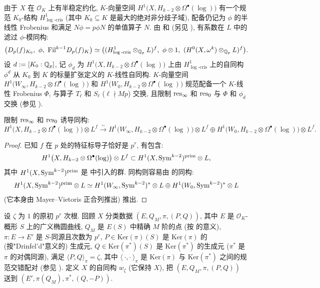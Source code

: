 由于 $X$ 在 $\mathcal{O}_K$ 上有半稳定约化, $K$-向量空间 $H^{1}\bigl(X,H_{k-2} \otimes \Omega^{\bullet}(\log)\bigr)$ 有一个规范 $K_0$-结构 $H^{1}_{\log\text{-}\mathrm{cris}}$ (其中 $K_0 \subseteq K$ 是最大的绝对非分歧子域), 配备仍记为 $\phi$ 的半线性 Frobenius 和满足 $N\phi = p\phi N$ 的单值算子 $N$.
由 \cite{ref:27} 和 \cite{ref:28} (另见 \cite{ref:16}), 有系数在 $L$ 中的滤过 $\phi$-模同构:
\begin{equation}
\label{eq:20}
\bigl(D_p(f)_{K_0},\ \phi,\ \mathrm{Fil}^{k-1}D_p(f)_K\bigr)
\simeq \bigl((H^{1}_{\log\text{-}\mathrm{cris}} \otimes_{\Qp} L)^{f},\ \phi \otimes 1,\ (H^{0}(X,\omega^{k}) \otimes_{\Qp} L)^{f}\bigr).
\end{equation}
设 $d := [K_0:\mathbb{Q}_p]$, 记 $\phi_d$ 为 $H^{1}\bigl(X,H_{k-2} \otimes \Omega^{\bullet}(\log)\bigr)$ 上由 $H^{1}_{\log\text{-}\mathrm{cris}}$ 上的自同构 $\phi^{d}$ 从 $K_0$ 到 $K$ 的标量扩张定义的 $K$-线性自同构.
$K$-向量空间 $H^{1}\bigl(W_{\infty},H_{k-2} \otimes \Omega^{\bullet}(\log)\bigr)$ 和 $H^{1}\bigl(W_0,H_{k-2} \otimes \Omega^{\bullet}(\log)\bigr)$ 规范配备一个 $K$-线性 Frobenius $\Phi$, 与算子 $T_{\ell}$ 和 $S_{\ell}$ ($\ell \nmid Mp$) 交换, 且限制 $\operatorname{res}_{\infty}$ 和 $\operatorname{res}_0$ 与 $\Phi$ 和 $\phi_d$ 交换 (参见 \cite{ref:16}).

\begin{lemma}\label{lem:4.4.2}
限制 $\operatorname{res}_{\infty}$ 和 $\operatorname{res}_0$ 诱导同构:
\[
H^{1}\bigl(X,H_{k-2} \otimes \Omega^{\bullet}(\log)\bigr) \otimes L^{f}
\xrightarrow{\sim} H^{1}\bigl(W_{\infty},H_{k-2} \otimes \Omega^{\bullet}(\log)\bigr) \otimes L^{f}
\oplus H^{1}\bigl(W_0,H_{k-2} \otimes \Omega^{\bullet}(\log)\bigr) \otimes L^{f}.
\]
\end{lemma}

\begin{proof}
已知 $f$ 在 $p$ 处的特征标导子恰好是 $p^{r}$, 有包含:
\[
H^{1}\bigl(X,H_{k-2} \otimes \Omega^{\bullet}(\log)\bigr) \otimes L^{f} \subset H^{1}(X,\operatorname{Sym}^{k-2})^{\mathrm{prim}} \otimes L,
\]
其中 $H^{1}(X,\operatorname{Sym}^{k-2})^{\mathrm{prim}}$ 是 \cite[\S2]{ref:14} 中引入的群.
同构则容易由 \cite[Th.~2.1]{ref:14} 的同构:
\[
H^{1}(X,\operatorname{Sym}^{k-2})^{\mathrm{prim}} \otimes L \simeq H^{1}(W_{\infty},\operatorname{Sym}^{k-2})^{*} \otimes L \oplus H^{1}(W_0,\operatorname{Sym}^{k-2})^{*} \otimes L
\]
(它本身由 Mayer--Vietoris 正合列推出) 推出.
\end{proof}

设 $\zeta$ 为 $1$ 的原初 $p^{r}$ 次根.
回顾 $X$ 分类数据 $(E,Q_M,\pi,(P,Q))$, 其中 $E$ 是 $\mathcal{O}_K$-概形 $S$ 上的广义椭圆曲线, $Q_M$ 是 $E(S)$ 中精确 $M$ 阶的点 (按 \cite[\S1.4]{ref:36} 的意义), $\pi : E \to E'$ 是 $S$-同源且次数为 $p^{r}$, $P \in \mathrm{Ker}(\pi)(S)$ 是 $\mathrm{Ker}(\pi)$ 的 (按"Drinfel'd"意义的) 生成元, $Q \in \mathrm{Ker}(\pi^{*})(S)$ 是 $\mathrm{Ker}(\pi^{*})$ 的生成元 ($\pi^{*}$ 是 $\pi$ 的对偶同源), 满足 $\langle P,Q \rangle_{\pi} = \zeta$, 其中 $\langle\ \cdot,\cdot\ \rangle_{\pi}$ 是 $\mathrm{Ker}(\pi)$ 与 $\mathrm{Ker}(\pi^{*})$ 之间的规范交错配对 (参见 \cite[\S2.8]{ref:36}).
定义 $X$ 的自同构 $w_{\zeta}$ (它保持 $X$), 把 $(E,Q_M,\pi,(P,Q))$ 送到 $(E',\pi(Q_M),\pi^{*},(Q,-P))$.

